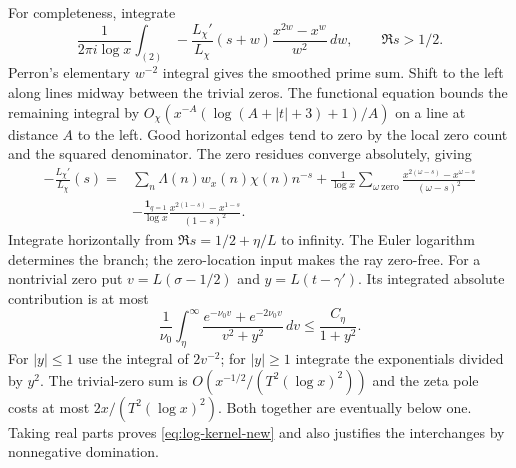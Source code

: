 For completeness, integrate
\[
 \frac1{2\pi i\log x}\int_{(2)}
 -\frac{L_\chi'}{L_\chi}(s+w)
                    \frac{x^{2w}-x^w}{w^2}\,dw,
       \qquad \Re s>1/2.
\]
Perron's elementary $w^{-2}$ integral gives the smoothed prime sum.
Shift to the left along lines midway between the trivial zeros. The
functional equation bounds the remaining integral by
$O_\chi(x^{-A}(\log(A+|t|+3)+1)/A)$ on a line at distance $A$
to the left. Good horizontal edges tend to zero by the local zero
count and the squared denominator. The zero residues converge
absolutely, giving
\begin{align*}
 -\frac{L_\chi'}{L_\chi}(s)
 ={}&\sum_n\Lambda(n)w_x(n)\chi(n)n^{-s}
 +\frac1{\log x}\sum_{\omega\ {\mathrm{zero}}}
          \frac{x^{2(\omega-s)}-x^{\omega-s}}{(\omega-s)^2}\\
 &-\frac{\mathbf1_{q=1}}{\log x}
          \frac{x^{2(1-s)}-x^{1-s}}{(1-s)^2}.
\end{align*}
Integrate horizontally from $\Re s=1/2+\eta/L$ to infinity.
The Euler logarithm determines the branch; the zero-location input
makes the ray zero-free. For a nontrivial zero put
$v=L(\sigma-1/2)$ and $y=L(t-\gamma')$. Its integrated absolute
contribution is at most
\[
 \frac1{\nu_0}\int_\eta^\infty
       \frac{e^{-\nu_0v}+e^{-2\nu_0v}}{v^2+y^2}\,dv
                \le\frac{C_\eta}{1+y^2}.
\]
For $|y|\le1$ use the integral of $2v^{-2}$; for $|y|\ge1$
integrate the exponentials divided by $y^2$. The trivial-zero sum
is $O(x^{-1/2}/(T^2(\log x)^2))$ and the zeta pole costs at most
$2x/(T^2(\log x)^2)$. Both together are eventually below one.
Taking real parts proves \eqref{eq:log-kernel-new} and also
justifies the interchanges by nonnegative domination.

